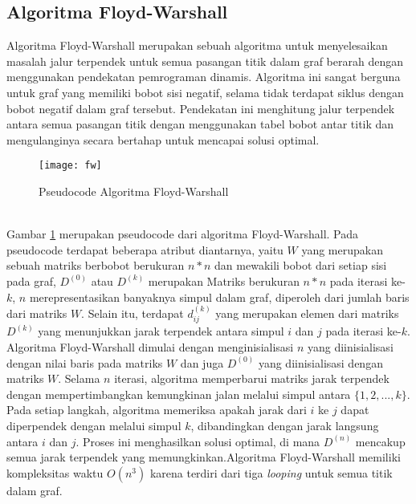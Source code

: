 \subsection{Algoritma Floyd-Warshall ~\cite{Cormen:09:intro}}
\label{floydwarshall}
Algoritma Floyd-Warshall merupakan sebuah algoritma untuk menyelesaikan masalah jalur terpendek untuk semua pasangan titik dalam graf berarah dengan menggunakan pendekatan pemrograman dinamis. Algoritma ini sangat berguna untuk graf yang memiliki bobot sisi negatif, selama tidak terdapat siklus dengan bobot negatif dalam graf tersebut. Pendekatan ini menghitung jalur terpendek antara semua pasangan titik dengan menggunakan tabel bobot antar titik dan mengulanginya secara bertahap untuk mencapai solusi optimal.
\begin{figure}[h] 
    \centering  
    \texttt{[image: fw]}  
    \caption{Pseudocode Algoritma Floyd-Warshall}
    \label{fig:pseudocodefw} 
\end{figure}
\noindent
\\
Gambar \ref{fig:pseudocodefw} merupakan pseudocode dari algoritma Floyd-Warshall. Pada pseudocode terdapat beberapa atribut diantarnya, yaitu $W$ yang merupakan sebuah matriks berbobot berukuran $n*n$ dan mewakili bobot dari setiap sisi pada graf, $D^{(0)}$ atau $D^{(k)}$ merupakan Matriks berukuran $n*n$ pada iterasi ke-$k$, $n$ merepresentasikan banyaknya simpul dalam graf, diperoleh dari jumlah baris dari matriks $W$. Selain itu, terdapat $d_{ij}^{(k)}$ yang merupakan elemen dari matriks $D^{(k)}$ yang menunjukkan jarak terpendek antara simpul $i$ dan $j$ pada iterasi ke-$k$. Algoritma Floyd-Warshall dimulai dengan menginisialisasi $n$ yang diinisialisasi dengan nilai baris pada matriks $W$ dan juga $D^{(0)}$ yang diinisialisasi dengan matriks $W$. 
\newpage
\noindent
Selama $n$ iterasi, algoritma memperbarui matriks jarak terpendek dengan mempertimbangkan kemungkinan jalan melalui simpul antara $\{1,2,...,k\}$. Pada setiap langkah, algoritma memeriksa apakah jarak dari $i$ ke $j$ dapat diperpendek dengan melalui simpul $k$, dibandingkan dengan jarak langsung antara $i$ dan $j$. Proses ini menghasilkan solusi optimal, di mana $D^{(n)}$ mencakup semua jarak terpendek yang memungkinkan.Algoritma Floyd-Warshall memiliki kompleksitas waktu $O(n^3)$ karena terdiri dari tiga \textit{looping} untuk semua titik dalam graf.


